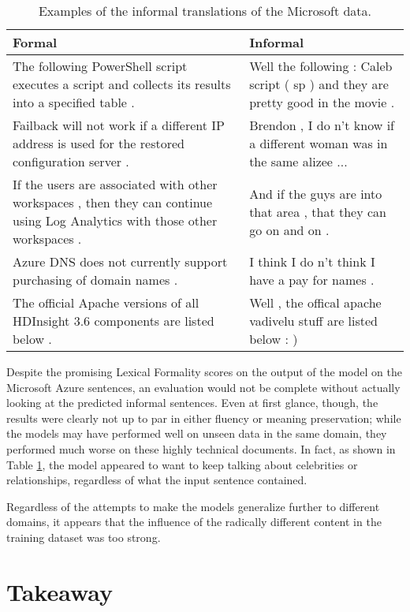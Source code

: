 \begin{table}[h]
\centering
 \begin{tabular}{|| p{6cm} | p{6cm} ||} 
 \hline
 Formal & Informal \\ [0.3ex] 
 \hline\hline
 The following PowerShell script executes a script and collects its results into a specified table . & 
    Well the following : Caleb script ( sp ) and they are pretty good in the movie . \\
 \hline
 Failback will not work if a different IP address is used for the restored configuration server . & 
    Brendon , I do n't know if a different woman was in the same alizee ... \\
 \hline
 If the users are associated with other workspaces , then they can continue using Log Analytics with those other workspaces . & 
    And if the guys are into that area , that they can go on and on . \\
 \hline
 Azure DNS does not currently support purchasing of domain names . & 
    I think I do n't think I have a pay for names . \\
 \hline
 The official Apache versions of all HDInsight 3.6 components are listed below . & 
    Well , the offical apache vadivelu stuff are listed below : ) \\
 \hline
\end{tabular}
\caption{Examples of the informal translations of the Microsoft data.}
\label{microsoft-output-examples}
\end{table}

Despite the promising Lexical Formality scores on the output of the model on the Microsoft Azure sentences, an evaluation would not be complete without actually looking at the predicted informal sentences. Even at first glance, though, the results were clearly not up to par in either fluency or meaning preservation; while the models may have performed well on unseen data in the same domain, they performed much worse on these highly technical documents. In fact, as shown in Table \ref{microsoft-output-examples}, the model appeared to want to keep talking about celebrities or relationships, regardless of what the input sentence contained.

Regardless of the attempts to make the models generalize further to different domains, it appears that the influence of the radically different content in the training dataset was too strong.

\section{Takeaway}

